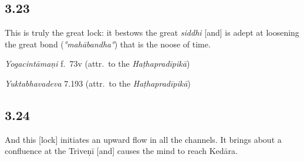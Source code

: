 \begin{ekdosis}
\subsection*{3.23}
\begin{translation}[hp03_023]
This is truly the great lock: it bestows the great \emph{siddhi} [and] is adept at loosening the great bond (\emph{°mahābandha°}) that is the noose of time.
\end{translation}


\begin{testimonia}[hp03_023]
\emph{Yogacintāmaṇi} f.~73v (attr.~to the \emph{Haṭhapradīpikā})
\begin{versinnote}
\end{versinnote}

\emph{Yuktabhavadeva} 7.193 (attr.~to the \emph{Haṭhapradīpikā})
\begin{versinnote}
\end{versinnote}
\end{testimonia}


\subsection*{3.24}
\begin{translation}[hp03_024]
And this [lock] initiates an upward flow in all the channels. It brings about a confluence at the Triveṇī [and] causes the mind to reach Kedāra.
\end{translation}


\end{ekdosis}
